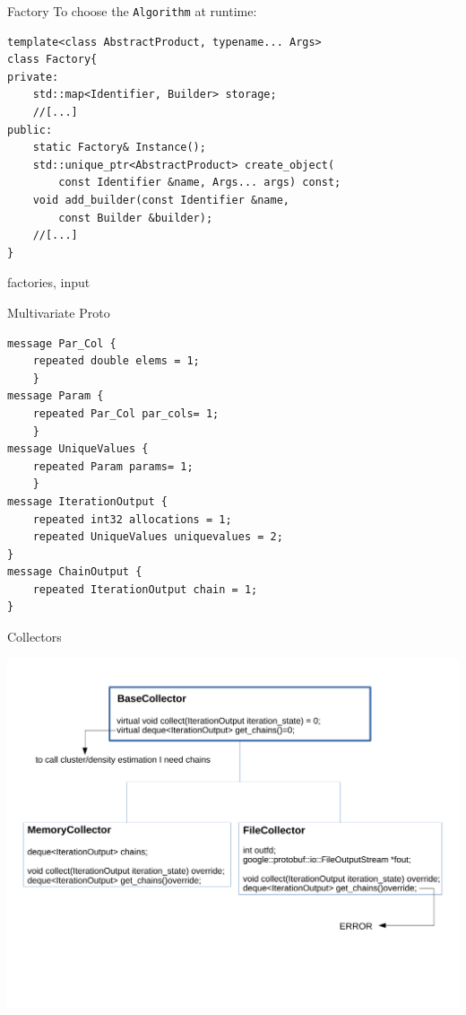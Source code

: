 \begin{frame}[fragile]{Factory}
To choose the \verb|Algorithm| at runtime:
\begin{verbatim}
template<class AbstractProduct, typename... Args>
class Factory{
private:
    std::map<Identifier, Builder> storage;
    //[...]
public:
    static Factory& Instance();
    std::unique_ptr<AbstractProduct> create_object(
        const Identifier &name, Args... args) const;
    void add_builder(const Identifier &name,
        const Builder &builder);
    //[...]
}
\end{verbatim}
factories, input
\end{frame}


\begin{frame}[fragile] {Multivariate Proto}
\begin{small}
\begin{verbatim}
message Par_Col {
    repeated double elems = 1;
    }
message Param {
    repeated Par_Col par_cols= 1;
    }
message UniqueValues {
    repeated Param params= 1;
    }
message IterationOutput {
    repeated int32 allocations = 1;
    repeated UniqueValues uniquevalues = 2;
}
message ChainOutput {
    repeated IterationOutput chain = 1;
}
\end{verbatim}
\end{small}
\end{frame}


\begin{frame}{Collectors}
	\begin{center}
		\includegraphics[scale=0.35]{etc/collectors.pdf}
	\end{center}
\end{frame}
